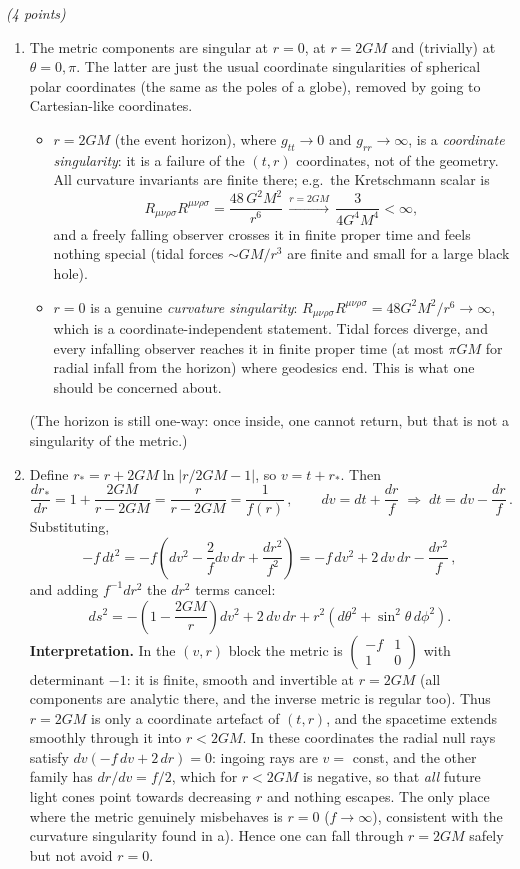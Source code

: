 \documentclass[12pt]{article}
\newcommand{\be}{\begin{equation}}
\newcommand{\ee}{\end{equation}}
\newcounter{quesno}
\newcommand{\ques}[1]{\vspace{2em}\stepcounter{quesno}
\noindent{\bf Question \thequesno.} \emph{(#1 points)\\}
}
\begin{document}
\ques{4}
\begin{enumerate}[label=\alph*)]
\item The metric components are singular at $r=0$, at $r=2GM$ and (trivially) at $\theta=0,\pi$. The latter are just the usual coordinate singularities of spherical polar coordinates (the same as the poles of a globe), removed by going to Cartesian-like coordinates.

\begin{itemize}
\item $r=2GM$ (the event horizon), where $g_{tt}\to0$ and $g_{rr}\to\infty$, is a \emph{coordinate singularity}: it is a failure of the $(t,r)$ coordinates, not of the geometry. All curvature invariants are finite there; e.g.\ the Kretschmann scalar is
\be
R_{\mu\nu\rho\sigma}R^{\mu\nu\rho\sigma} = \frac{48\,G^2M^2}{r^6}\,\xrightarrow{r=2GM}\, \frac{3}{4G^4M^4}<\infty,
\ee
and a freely falling observer crosses it in finite proper time and feels nothing special (tidal forces $\sim GM/r^3$ are finite and small for a large black hole).
\item $r=0$ is a genuine \emph{curvature singularity}: $R_{\mu\nu\rho\sigma}R^{\mu\nu\rho\sigma}=48G^2M^2/r^6\to\infty$, which is a coordinate-independent statement. Tidal forces diverge, and every infalling observer reaches it in finite proper time (at most $\pi GM$ for radial infall from the horizon) where geodesics end. This is what one should be concerned about.
\end{itemize}
(The horizon is still one-way: once inside, one cannot return, but that is not a singularity of the metric.)

\item Define $r_*=r+2GM\ln|r/2GM-1|$, so $v=t+r_*$. Then
\be
\frac{dr_*}{dr}=1+\frac{2GM}{r-2GM}=\frac{r}{r-2GM}=\frac1{f(r)}\,,
\qquad dv = dt+\frac{dr}{f}\;\Rightarrow\; dt = dv-\frac{dr}{f}\,.
\ee
Substituting,
\be
-f\,dt^2 = -f\left(dv^2-\frac{2}{f}dv\,dr+\frac{dr^2}{f^2}\right)=-f\,dv^2+2\,dv\,dr-\frac{dr^2}{f}\,,
\ee
and adding $f^{-1}dr^2$ the $dr^2$ terms cancel:
\be
ds^2 = -\left(1-\frac{2GM}{r}\right)dv^2 + 2\,dv\,dr + r^2\left(d\theta^2+\sin^2\theta\,d\phi^2\right).
\ee
\textbf{Interpretation.} In the $(v,r)$ block the metric is $\begin{pmatrix}-f&1\\1&0\end{pmatrix}$ with determinant $-1$: it is finite, smooth and invertible at $r=2GM$ (all components are analytic there, and the inverse metric is regular too). Thus $r=2GM$ is only a coordinate artefact of $(t,r)$, and the spacetime extends smoothly through it into $r<2GM$. In these coordinates the radial null rays satisfy $dv(-f\,dv+2\,dr)=0$: ingoing rays are $v=$ const, and the other family has $dr/dv=f/2$, which for $r<2GM$ is negative, so that \emph{all} future light cones point towards decreasing $r$ and nothing escapes. The only place where the metric genuinely misbehaves is $r=0$ ($f\to\infty$), consistent with the curvature singularity found in a). Hence one can fall through $r=2GM$ safely but not avoid $r=0$.
\end{enumerate}
\end{document}
